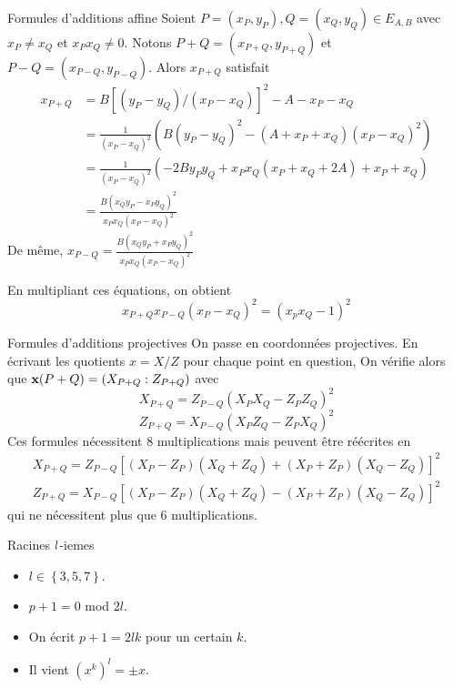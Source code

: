 \documentclass{beamer}
\begin{document}
\begin{frame}[noframenumbering]{Formules d'additions affine}\small
	Soient $P=(x_P,y_P), Q=(x_Q,y_Q) \in E_{A,B}$ avec $x_P \neq x_Q$ et $x_P x_Q \neq 0$.
	Notons $P+Q=(x_{P+Q},y_{P+Q})$ et $P-Q=(x_{P-Q},y_{P-Q})$. Alors $x_{P+Q}$ satisfait
	\[\begin{aligned}
		x_{P+Q}	&= B[(y_P - y_Q)/(x_P-x_Q)]^2 - A - x_P - x_Q \\
		&= \frac{1}{(x_P-x_Q)^2}( B(y_P - y_Q)^2 - (A + x_P + x_Q)(x_P - x_Q)^2) \\
		&= \frac{1}{(x_P-x_Q)^2}( -2B y_P y_Q + x_P x_Q (x_P + x_Q + 2A) + x_P + x_Q) \\
		&= \frac{B(x_Q y_P - x_P y_Q)^2}{x_P x_Q (x_P-x_Q)^2}
	\end{aligned}\]
	De même, $x_{P-Q} = \frac{B(x_Q y_P + x_P y_Q)^2}{x_P x_Q (x_P-x_Q)^2}$

	En multipliant ces équations, on obtient
	\[x_{P+Q} x_{P-Q} (x_P - x_Q)^2 = (x_p x_Q -1)^2\]
\end{frame}

\begin{frame}[noframenumbering]{Formules d'additions projectives}\small
	On passe en coordonnées projectives. En écrivant les quotients $x=X/Z$ pour chaque point en question,
	On vérifie alors que $\textbf{x}(P+Q)=(X_{P+Q}:Z_{P+Q})$ avec \[X_{P+Q} = Z_{P-Q}(X_P X_Q - Z_P Z_Q)^2\]\[Z_{P+Q} = X_{P-Q}(X_P Z_Q - Z_P X_Q)^2\]
	Ces formules nécessitent 8 multiplications mais peuvent être réécrites en
	\[\begin{array}{l}
		X_{P+Q} = Z_{P-Q}[(X_P-Z_P)(X_Q+Z_Q) + (X_P+Z_P)(X_Q-Z_Q)]^2\\
		Z_{P+Q} = X_{P-Q}[(X_P-Z_P)(X_Q+Z_Q) - (X_P+Z_P)(X_Q-Z_Q)]^2
	\end{array}\]
	qui ne nécessitent plus que 6 multiplications.
\end{frame}

\begin{frame}[noframenumbering]{Racines $\mathnormal{l}$-iemes}
	\begin{itemize}
		\item $l\in\left\{3, 5, 7\right\}$.
		\item $p + 1 = 0$ mod $ 2l$.
		\item On \'ecrit $p+1 = 2lk$ pour un certain $k$.
		\item Il vient $(x^k)^l = \pm x$.
	\end{itemize}
\end{frame}
\end{document}

